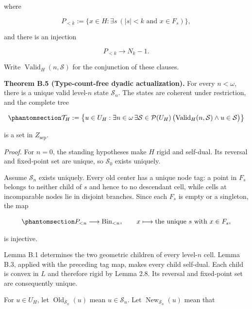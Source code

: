 \documentclass[
  english,
  11pt,
  reqno]{amsart}
\begin{document}
where

\[
   P_{<k}
   :=
   \{x\in H:\exists s\ (|s|<k\text{ and }x\in F_s)\},
\]

and there is an injection

\[
   P_{<k}\longrightarrow N_k-1.
\]

Write \(\operatorname{Valid}_H(n,\mathcal S)\) for the conjunction of
these clauses.

\protect{}\label{thm:b-5-tree-actualization}

\textbf{Theorem B.5 (Type-count-free dyadic actualization).} For every
\(n<\omega\), there is a unique valid level-\(n\) state
\(\mathcal S_n\). The states are coherent under restriction, and the
complete tree

\begin{equation}\protect\phantomsection\label{eq:typefree-complete-tree}{
\mathcal T_H
:=
\left\{
 u\in U_H:
 \exists n\in\omega\,
 \exists\mathcal S\in\mathcal P(U_H)\,
 \bigl(
  \operatorname{Valid}_H(n,\mathcal S)
  \wedge
  u\in\mathcal S
 \bigr)
\right\}
}\end{equation}

is a set in \(Z_{\mathrm{sep}}\).

\emph{Proof.} For \(n=0\), the standing hypotheses make \(H\) rigid and
self-dual. Its reversal and fixed-point set are unique, so
\(\mathcal S_0\) exists uniquely.

Assume \(\mathcal S_n\) exists uniquely. Every old center has a unique
node tag: a point in \(F_s\) belongs to neither child of \(s\) and hence
to no descendant cell, while cells at incomparable nodes lie in disjoint
branches. Since each \(F_s\) is empty or a singleton, the map

\begin{equation}\protect\phantomsection\label{eq:typefree-old-center-tags}{
P_{<n}\longrightarrow\operatorname{Bin}_{<n},
\qquad
x\longmapsto\text{the unique }s\text{ with }x\in F_s,
}\end{equation}

is injective.

Lemma B.1 determines the two geometric children of every level-\(n\)
cell. Lemma B.3, applied with the preceding tag map, makes every child
self-dual. Each child is convex in \(L\) and therefore rigid by Lemma
2.8. Its reversal and fixed-point set are consequently unique.

For \(u\in U_H\), let \(\operatorname{Old}_{\mathcal S_n}(u)\) mean
\(u\in\mathcal S_n\). Let \(\operatorname{New}_{\mathcal S_n}(u)\) mean
that
\end{document}
